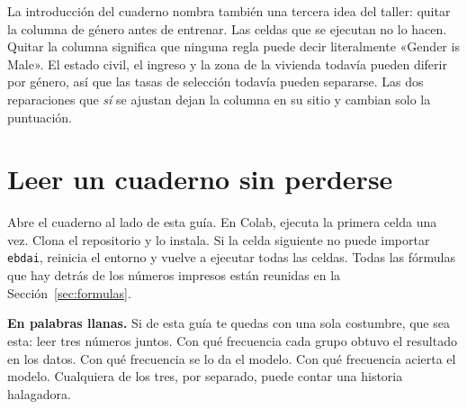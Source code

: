 \documentclass[11pt]{article}
\newcommand{\fn}[1]{\texttt{\small #1}}
\begin{document}
La introducción del cuaderno nombra también una tercera idea del taller: quitar la columna de género antes de entrenar. Las celdas que se ejecutan no lo hacen. Quitar la columna significa que ninguna regla puede decir literalmente «Gender is Male». El estado civil, el ingreso y la zona de la vivienda todavía pueden diferir por género, así que las tasas de selección todavía pueden separarse. Las dos reparaciones que \emph{sí} se ajustan dejan la columna en su sitio y cambian solo la puntuación.

\section{Leer un cuaderno sin perderse}
\label{sec:howto}

Abre el cuaderno al lado de esta guía. En Colab, ejecuta la primera celda una vez. Clona el repositorio y lo instala. Si la celda siguiente no puede importar \fn{ebdai}, reinicia el entorno y vuelve a ejecutar todas las celdas. Todas las fórmulas que hay detrás de los números impresos están reunidas en la Sección~\ref{sec:formulas}.

\begin{plainwords}
\textbf{En palabras llanas.} Si de esta guía te quedas con una sola costumbre, que sea esta: leer tres números juntos. Con qué frecuencia cada grupo obtuvo el resultado en los datos. Con qué frecuencia se lo da el modelo. Con qué frecuencia acierta el modelo. Cualquiera de los tres, por separado, puede contar una historia halagadora.
\end{plainwords}
\end{document}
